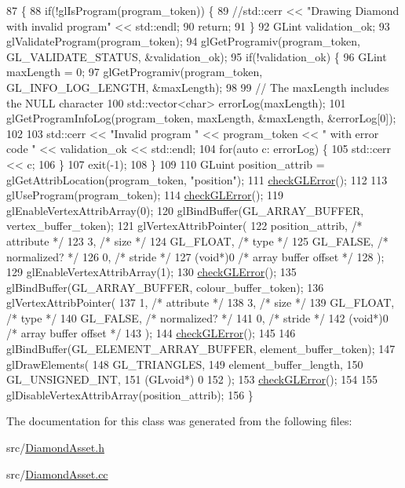 \begin{DoxyCode}
87                                             \{
88   \textcolor{keywordflow}{if}(!glIsProgram(program\_token)) \{
89     \textcolor{comment}{//std::cerr << "Drawing Diamond with invalid program" << std::endl;}
90     \textcolor{keywordflow}{return};
91   \}
92   GLint validation\_ok;
93   glValidateProgram(program\_token);
94   glGetProgramiv(program\_token, GL\_VALIDATE\_STATUS, &validation\_ok);
95   \textcolor{keywordflow}{if}(!validation\_ok) \{
96     GLint maxLength = 0;
97     glGetProgramiv(program\_token, GL\_INFO\_LOG\_LENGTH, &maxLength);
98 
99     \textcolor{comment}{// The maxLength includes the NULL character}
100     std::vector<char> errorLog(maxLength);
101     glGetProgramInfoLog(program\_token, maxLength, &maxLength, &errorLog[0]);
102 
103     std::cerr << \textcolor{stringliteral}{"Invalid program "} << program\_token << \textcolor{stringliteral}{" with error code "} << validation\_ok << std::endl;
104     \textcolor{keywordflow}{for}(\textcolor{keyword}{auto} c: errorLog) \{
105       std::cerr << c;
106     \}
107     exit(-1);
108   \}
109 
110   GLuint position\_attrib = glGetAttribLocation(program\_token, \textcolor{stringliteral}{"position"});
111   \hyperlink{_diamond_asset_8cc_a75f201b0e53e68726854997957322b8d}{checkGLError}();
112 
113   glUseProgram(program\_token);
114   \hyperlink{_diamond_asset_8cc_a75f201b0e53e68726854997957322b8d}{checkGLError}();
119   glEnableVertexAttribArray(0);
120   glBindBuffer(GL\_ARRAY\_BUFFER, vertex\_buffer\_token);
121   glVertexAttribPointer(
122     position\_attrib,        \textcolor{comment}{/* attribute */}
123     3,        \textcolor{comment}{/* size */}
124     GL\_FLOAT,   \textcolor{comment}{/* type */}
125     GL\_FALSE,   \textcolor{comment}{/* normalized? */}
126     0,        \textcolor{comment}{/* stride */}
127     (\textcolor{keywordtype}{void}*)0    \textcolor{comment}{/* array buffer offset */}
128   );
129   glEnableVertexAttribArray(1);
130   \hyperlink{_diamond_asset_8cc_a75f201b0e53e68726854997957322b8d}{checkGLError}();
135   glBindBuffer(GL\_ARRAY\_BUFFER, colour\_buffer\_token);
136   glVertexAttribPointer(
137     1,        \textcolor{comment}{/* attribute */}
138     3,        \textcolor{comment}{/* size */}
139     GL\_FLOAT,   \textcolor{comment}{/* type */}
140     GL\_FALSE,   \textcolor{comment}{/* normalized? */}
141     0,        \textcolor{comment}{/* stride */}
142     (\textcolor{keywordtype}{void}*)0    \textcolor{comment}{/* array buffer offset */}
143   );
144   \hyperlink{_diamond_asset_8cc_a75f201b0e53e68726854997957322b8d}{checkGLError}();
145 
146   glBindBuffer(GL\_ELEMENT\_ARRAY\_BUFFER, element\_buffer\_token);
147   glDrawElements(
148     GL\_TRIANGLES,
149     element\_buffer\_length,
150     GL\_UNSIGNED\_INT,
151     (GLvoid*) 0
152   );
153   \hyperlink{_diamond_asset_8cc_a75f201b0e53e68726854997957322b8d}{checkGLError}();
154 
155   glDisableVertexAttribArray(position\_attrib);
156 \}
\end{DoxyCode}


The documentation for this class was generated from the following files\+:\begin{DoxyCompactItemize}
\item 
src/\hyperlink{_diamond_asset_8h}{Diamond\+Asset.\+h}\item 
src/\hyperlink{_diamond_asset_8cc}{Diamond\+Asset.\+cc}\end{DoxyCompactItemize}
